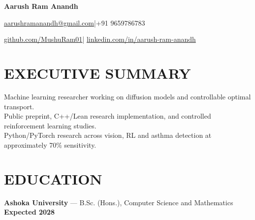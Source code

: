\documentclass[10pt,a4paper]{article}
\begin{document}
{\LARGE\bfseries Aarush Ram Anandh}\par\vspace{4pt}
\href{mailto:aarushramanandh@gmail.com}{aarushramanandh@gmail.com}\quad|\quad +91 9659786783\par\vspace{2pt}
\href{https://github.com/MushuRam01}{github.com/MushuRam01}\quad|\quad
\href{https://www.linkedin.com/in/aarush-ram-anandh/}{linkedin.com/in/aarush-ram-anandh}\par

\section{EXECUTIVE SUMMARY}
Machine learning researcher working on diffusion models and controllable optimal transport.\\
Public preprint, C++/Lean research implementation, and controlled reinforcement learning studies.\\
Python/PyTorch research across vision, RL and asthma detection at approximately 70\% sensitivity.\par
\section{EDUCATION}
\textbf{Ashoka University} --- B.Sc. (Hons.), Computer Science and Mathematics \hfill \textbf{Expected 2028}
\end{document}
